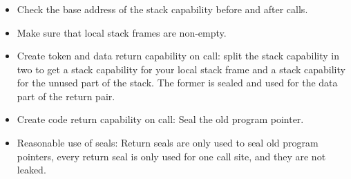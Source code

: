 \documentclass[aspectratio=169]{beamer}
\begin{document}
\begin{frame}
\end{frame}

\begin{frame}
  \frametitle{\stktokens{}}
  \begin{itemize}
  \item Check the base address of the stack capability before and after calls.
  \item Make sure that local stack frames are non-empty.
  \item Create token and data return capability on call: split the stack
    capability in two to get a stack capability for your local stack frame and a
    stack capability for the unused part of the stack. The former is sealed and
    used for the data part of the return pair.
  \item Create code return capability on call: Seal the old program pointer.
  \item Reasonable use of seals: Return seals are only used to seal old program
    pointers, every return seal is only used for one call site, and they are not
    leaked. %
  \end{itemize}
\end{frame}
\end{document}
